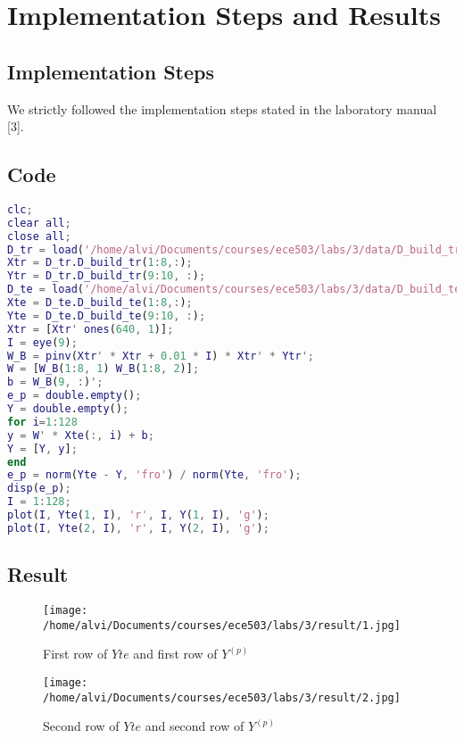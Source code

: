 \section{Implementation Steps and Results}
\label{sect:implementation-result}

\subsection{Implementation Steps}
\label{subsect:implementation_steps}
We strictly followed the implementation steps stated in the laboratory manual [3].

\subsection{Code}
\label{subsect:code}

\begin{lstlisting}[language=Matlab]
clc;
clear all;
close all;
D_tr = load('/home/alvi/Documents/courses/ece503/labs/3/data/D_build_tr.mat');
Xtr = D_tr.D_build_tr(1:8,:);
Ytr = D_tr.D_build_tr(9:10, :);
D_te = load('/home/alvi/Documents/courses/ece503/labs/3/data/D_build_te.mat');
Xte = D_te.D_build_te(1:8,:);
Yte = D_te.D_build_te(9:10, :);
Xtr = [Xtr' ones(640, 1)];
I = eye(9);
W_B = pinv(Xtr' * Xtr + 0.01 * I) * Xtr' * Ytr';
W = [W_B(1:8, 1) W_B(1:8, 2)];
b = W_B(9, :)';
e_p = double.empty();
Y = double.empty();
for i=1:128
y = W' * Xte(:, i) + b;
Y = [Y, y];
end
e_p = norm(Yte - Y, 'fro') / norm(Yte, 'fro');
disp(e_p);
I = 1:128;
plot(I, Yte(1, I), 'r', I, Y(1, I), 'g');
plot(I, Yte(2, I), 'r', I, Y(2, I), 'g');
\end{lstlisting}

\subsection{Result}
\label{subsect:result}
\begin{figure}[h]
	\centering
	\texttt{[image: /home/alvi/Documents/courses/ece503/labs/3/result/1.jpg]}
	\caption{First row of $Yte$ and first row of $Y^{(p)}$}
	\label{fig:1}
\end{figure}

\begin{figure}[h]
	\centering
	\texttt{[image: /home/alvi/Documents/courses/ece503/labs/3/result/2.jpg]}
	\caption{Second row of $Yte$ and second row of $Y^{(p)}$}
	\label{fig:1}
\end{figure}